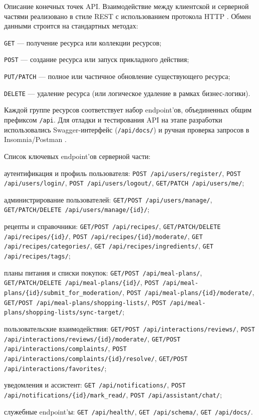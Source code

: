 Описание конечных точек API. Взаимодействие между клиентской и серверной частями реализовано в стиле REST с использованием протокола HTTP \cite{fielding_rest_2000,rfc9110_http}. Обмен данными строится на стандартных методах:
\begin{compactlist}
  \item \texttt{GET} --- получение ресурса или коллекции ресурсов;
  \item \texttt{POST} --- создание ресурса или запуск прикладного действия;
  \item \texttt{PUT/PATCH} --- полное или частичное обновление существующего ресурса;
  \item \texttt{DELETE} --- удаление ресурса (или логическое удаление в рамках бизнес-логики).
\end{compactlist}

Каждой группе ресурсов соответствует набор endpoint'ов, объединенных общим префиксом \texttt{/api}. Для отладки и тестирования API на этапе разработки использовались Swagger-интерфейс (\texttt{/api/docs/}) и ручная проверка запросов в Insomnia/Postman \cite{openapi_spec_3_1,insomnia_docs_2026,postman_docs_2026}.

Список ключевых endpoint'ов серверной части:
\begin{compactlist}
  \item аутентификация и профиль пользователя:
  \texttt{POST /api/users/register/},
  \texttt{POST /api/users/login/},
  \texttt{POST /api/users/logout/},
  \texttt{GET/PATCH /api/users/me/};
  \item администрирование пользователей:
  \texttt{GET/POST /api/users/manage/},
  \texttt{GET/PATCH/DELETE /api/users/manage/\{id\}/};
  \item рецепты и справочники:
  \texttt{GET/POST /api/recipes/},
  \texttt{GET/PATCH/DELETE /api/recipes/\{id\}/},
  \texttt{POST /api/recipes/\{id\}/moderate/},
  \texttt{GET /api/recipes/categories/},
  \texttt{GET /api/recipes/ingredients/},
  \texttt{GET /api/recipes/tags/};
  \item планы питания и списки покупок:
  \texttt{GET/POST /api/meal-plans/},
  \texttt{GET/PATCH/DELETE /api/meal-plans/\{id\}/},
  \texttt{POST /api/meal-plans/\{id\}/submit\_for\_moderation/},
  \texttt{POST /api/meal-plans/\{id\}/moderate/},
  \texttt{GET/POST /api/meal-plans/shopping-lists/},
  \texttt{POST /api/meal-plans/shopping-lists/sync-target/};
  \item пользовательские взаимодействия:
  \texttt{GET/POST /api/interactions/reviews/},
  \texttt{POST /api/interactions/reviews/\{id\}/moderate/},
  \texttt{GET/POST /api/interactions/complaints/},
  \texttt{POST /api/interactions/complaints/\{id\}/resolve/},
  \texttt{GET/POST /api/interactions/favorites/};
  \item уведомления и ассистент:
  \texttt{GET /api/notifications/},
  \texttt{POST /api/notifications/\{id\}/mark\_read/},
  \texttt{POST /api/assistant/chat/};
  \item служебные endpoint'ы:
  \texttt{GET /api/health/},
  \texttt{GET /api/schema/},
  \texttt{GET /api/docs/}.
\end{compactlist}

